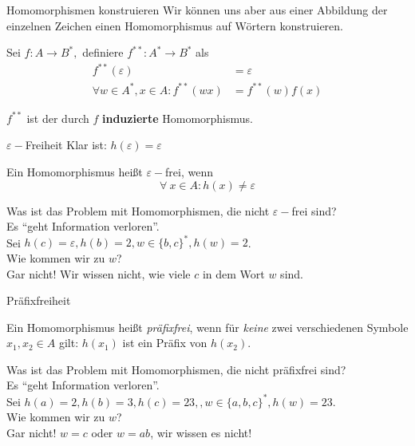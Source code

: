 \begin{frame}{Homomorphismen konstruieren}
	Wir können uns aber aus einer Abbildung der einzelnen Zeichen einen Homomorphismus auf Wörtern konstruieren.
	\begin{Definition}
		Sei $f: A \to B^*,$ \pause definiere $f^{**}:A^* \to B^*$ als
		\begin{align*}
		f^{**}(\varepsilon) &= \varepsilon  \\
		\forall w\in A^*, x\in A: f^{**}(wx) &= f^{**}(w) f(x)       
		\end{align*}
	\end{Definition}

	$f^{**}$ ist der durch $f$ \textbf{induzierte} Homomorphismus.
\end{frame}

\begin{frame}{$\varepsilon-$Freiheit}
	Klar ist: $h(\varepsilon) = \varepsilon$
	
	\pause
	\begin{Definition}
		Ein Homomorphismus heißt $\varepsilon-$frei, wenn 	$$ \forall\ x\in A : h(x) \neq \varepsilon $$
	\end{Definition}

	Was ist das Problem mit Homomorphismen, die nicht $\varepsilon-$frei sind? \\ \pause
	Es \enquote{geht Information verloren}.\\
	Sei $h(c) = \varepsilon, h(b) = 2, w \in \{b, c\}^*, h(w) = 2$.\\
	Wie kommen wir zu $w$?\\ \pause 
	Gar nicht! Wir wissen nicht, wie viele $c$ in dem Wort $w$ sind.
\end{frame}

\begin{frame}{Präfixfreiheit}
	\begin{Definition}
		Ein Homomorphismus heißt \emph{präfixfrei}, wenn für
		\emph{keine} zwei verschiedenen Symbole $x_1,x_2\in A$ gilt: $h(x_1)$
		ist ein Präfix von $h(x_2)$.
	\end{Definition}

	\vspace{5mm}
	Was ist das Problem mit Homomorphismen, die nicht präfixfrei sind? \\ \pause
	Es \enquote{geht Information verloren}.\\
	
	Sei $h(a) = 2, h(b) = 3, h(c) = 23, , w \in \{a, b, c\}^*, h(w) = 23$. \\
	Wie kommen wir zu $w$?\\ \pause
	Gar nicht! $w = c$ oder $w = ab$, wir wissen es nicht!
\end{frame}

